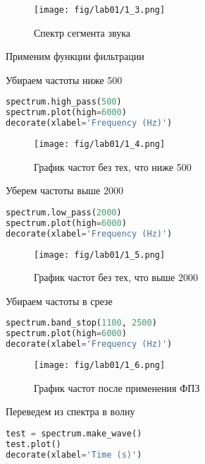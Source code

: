 \begin{figure}[H]
	\begin{center}
		\texttt{[image: fig/lab01/1\_3.png]}
		\caption{Спектр сегмента звука}
	\end{center}
\end{figure}

Применим функции фильтрации

Убираем частоты ниже 500
\begin{lstlisting}[language=Python]
spectrum.high_pass(500)
spectrum.plot(high=6000)
decorate(xlabel='Frequency (Hz)')
\end{lstlisting}

\begin{figure}[H]
	\begin{center}
		\texttt{[image: fig/lab01/1\_4.png]}
		\caption{График частот без тех, что ниже 500}
	\end{center}
\end{figure}

Уберем частоты выше 2000
\begin{lstlisting}[language=Python]
spectrum.low_pass(2000)
spectrum.plot(high=6000)
decorate(xlabel='Frequency (Hz)')
\end{lstlisting}

\begin{figure}[H]
	\begin{center}
		\texttt{[image: fig/lab01/1\_5.png]}
		\caption{График частот без тех, что выше 2000}
	\end{center}
\end{figure}

Убираем частоты в срезе
\begin{lstlisting}[language=Python]
spectrum.band_stop(1100, 2500)
spectrum.plot(high=6000)
decorate(xlabel='Frequency (Hz)')
\end{lstlisting}

\begin{figure}[H]
	\begin{center}
		\texttt{[image: fig/lab01/1\_6.png]}
		\caption{График частот после применения ФПЗ}
	\end{center}
\end{figure}

Переведем из спектра в волну
\begin{lstlisting}[language=Python]
test = spectrum.make_wave()
test.plot()
decorate(xlabel='Time (s)')
\end{lstlisting}

